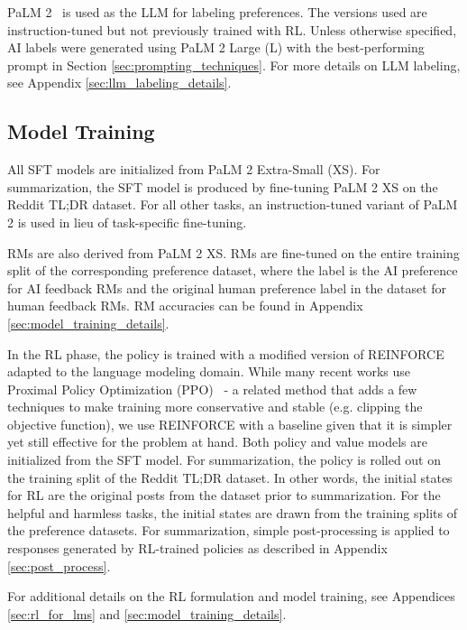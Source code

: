 \documentclass[11pt]{article}
\begin{document}
PaLM 2~\citep{palm2} is used as the LLM for labeling preferences. The versions used are instruction-tuned but not previously trained with RL. Unless otherwise specified, AI labels were generated using PaLM 2 Large (L) with the best-performing prompt in Section \ref{sec:prompting_techniques}. For more details on LLM labeling, see Appendix \ref{sec:llm_labeling_details}.


\subsection{Model Training}

All SFT models are initialized from PaLM 2 Extra-Small (XS). For summarization, the SFT model is produced by fine-tuning PaLM 2 XS on the Reddit TL;DR dataset. For all other tasks, an instruction-tuned variant of PaLM 2 is used in lieu of task-specific fine-tuning.

RMs are also derived from PaLM 2 XS. RMs are fine-tuned on the entire training split of the corresponding preference dataset, where the label is the AI preference for AI feedback RMs and the original human preference label in the dataset for human feedback RMs. RM accuracies can be found in Appendix \ref{sec:model_training_details}.

In the RL phase, the policy is trained with a modified version of REINFORCE~\citep{williams1992simple} adapted to the language modeling domain. While many recent works use Proximal Policy Optimization (PPO)~\citep{schulman2017proximal} - a related method that adds a few techniques to make training more conservative and stable (e.g. clipping the objective function), we use REINFORCE with a baseline given that it is simpler yet still effective for the problem at hand. Both policy and value models are initialized from the SFT model. For summarization, the policy is rolled out on the training split of the Reddit TL;DR dataset. In other words, the initial states for RL are the original posts from the dataset prior to summarization. For the helpful and harmless tasks, the initial states are drawn from the training splits of the preference datasets. For summarization, simple post-processing is applied to responses generated by RL-trained policies as described in Appendix \ref{sec:post_process}.

For additional details on the RL formulation and model training, see Appendices \ref{sec:rl_for_lms} and \ref{sec:model_training_details}.
\end{document}
